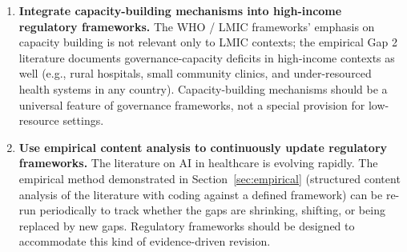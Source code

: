 \begin{enumerate}
  \item \textbf{Integrate capacity-building mechanisms
        into high-income regulatory frameworks.} The
        WHO / LMIC frameworks' emphasis on capacity
        building is not relevant only to LMIC contexts;
        the empirical Gap 2 literature documents
        governance-capacity deficits in high-income
        contexts as well (e.g., rural hospitals, small
        community clinics, and under-resourced health
        systems in any country). Capacity-building
        mechanisms should be a universal feature of
        governance frameworks, not a special provision
        for low-resource settings.

  \item \textbf{Use empirical content analysis to
        continuously update regulatory frameworks.}
        The literature on AI in healthcare is evolving
        rapidly. The empirical method demonstrated in
        Section~\ref{sec:empirical} (structured content
        analysis of the literature with coding against
        a defined framework) can be re-run periodically
        to track whether the gaps are shrinking,
        shifting, or being replaced by new gaps.
        Regulatory frameworks should be designed to
        accommodate this kind of evidence-driven
        revision.
\end{enumerate}

